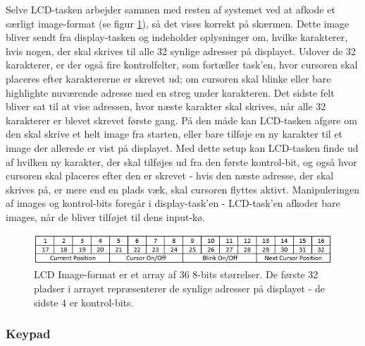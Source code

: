 Selve LCD-tasken arbejder sammen med resten af systemet ved at afkode et særligt image-format (se figur \ref{fig:LCD_array}), så det vises korrekt på skærmen. Dette image bliver sendt fra display-tasken og indeholder oplysninger om, hvilke karakterer, hvis nogen, der skal skrives til alle 32 synlige adresser på displayet. Udover de 32 karakterer, er der også fire kontrolfelter, som fortæller task'en, hvor cursoren skal placeres efter karaktererne er skrevet ud; om cursoren skal blinke eller bare highlighte nuværende adresse med en streg under karakteren. Det sidste felt bliver sat til at vise adressen, hvor næste karakter skal skrives, når alle 32 karakterer er blevet skrevet første gang. På den måde kan LCD-tasken afgøre om den skal skrive et helt image fra starten, eller bare tilføje en ny karakter til et image der allerede er vist på displayet. Med dette setup kan LCD-tasken finde ud af hvilken ny karakter, der skal tilføjes ud fra den første kontrol-bit, og også hvor cursoren skal placeres efter den er skrevet - hvis den næste adresse, der skal skrives på, er mere end en plads væk, skal cursoren flyttes aktivt. Manipuleringen af images og kontrol-bits foregår i display-task'en - LCD-task'en afkoder bare images, når de bliver tilføjet til dens input-kø.


\begin{figure}[ht]
			\begin{center}
			\includegraphics[scale=0.9]{Billeder/LCD_Array.PNG}
			\end{center}
			\caption{LCD Image-format er et array af 36 8-bits størrelser. De første 32 pladser i arrayet repræsenterer de synlige adresser på displayet - de sidste 4 er kontrol-bits.}
			\label{fig:LCD_array}
\end{figure}

\subsubsection{Keypad}

